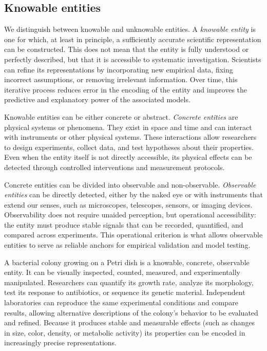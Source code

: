 \subsection*{Knowable entities}

We distinguish between knowable and unknowable entities. A \emph{knowable entity} is one for which, at least in principle, a sufficiently accurate scientific representation can be constructed. This does not mean that the entity is fully understood or perfectly described, but that it is accessible to systematic investigation. Scientists can refine its representations by incorporating new empirical data, fixing incorrect 
assumptions, or removing irrelevant information. Over time, this iterative process reduces error in the encoding of the entity and improves the predictive and explanatory power of the associated models.

Knowable entities can be either concrete or abstract. \emph{Concrete entities} are physical systems or phenomena. They exist in space and time and can interact with instruments or other physical systems. These interactions allow researchers to design experiments, collect data, and test hypotheses about their properties. Even when the entity itself is not directly accessible, its physical effects can be detected through controlled interventions and measurement protocols.

Concrete entities can be divided into observable and non-observable. \emph{Observable entities} can be directly detected, either by the naked eye or with instruments that extend our senses, such as microscopes, telescopes, sensors, or imaging devices. Observability does not require unaided perception, but operational accessibility: the entity must produce stable signals that can be recorded, quantified, and compared across experiments. This operational criterion is what allows observable entities to serve as reliable anchors for empirical validation and model testing.

\begin{example}
A bacterial colony growing on a Petri dish is a knowable, concrete, observable entity. It can be visually inspected, counted, measured, and experimentally manipulated. Researchers can quantify its growth rate, analyze its morphology, test its response to antibiotics, or sequence its genetic material. Independent laboratories can reproduce the same experimental conditions and compare results, allowing alternative descriptions of the colony's behavior to be evaluated and refined. Because it produces stable and measurable effects (such as changes in size, color, density, or metabolic activity) its properties can be encoded in increasingly precise representations.
\end{example}

